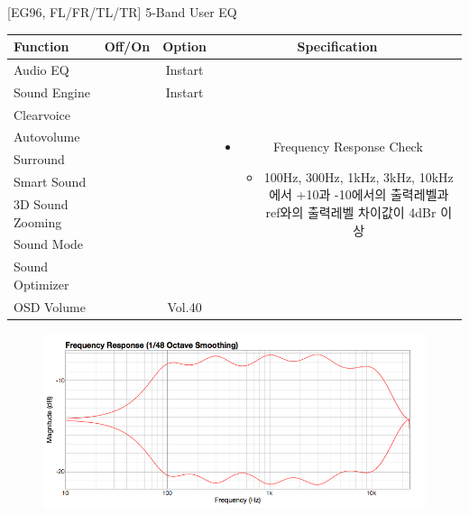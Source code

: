 \documentclass{beamer}
\begin{document}
\begin{frame}[t]{[EG96, FL/FR/TL/TR] 5-Band User EQ}
\begin{tiny}
\begin{tabular}{@{}lccc@{}}
\toprule
Function & Off/On & Option & Specification \\
\midrule
Audio EQ & \color{black}{Off} & Instart &
\multirow{10}{60mm}{
\begin{itemize}
\item Frequency Response Check
	\begin{itemize}
	\item 100Hz, 300Hz, 1kHz, 3kHz, 10kHz에서 +10과 -10에서의 출력레벨과 ref와의 출력레벨 차이값이 4dBr 이상
	\end{itemize}
\end{itemize}
} \\
Sound Engine & \color{blue}{On} & Instart & \\
Clearvoice & \color{black}{Off} & & \\
Autovolume & \color{black}{Off} & & \\
Surround & \color{black}{Off} & & \\
Smart Sound & \color{black}{Off} & & \\
3D Sound Zooming & \color{black}{Off} & & \\
Sound Mode & \color{blue}{On} & \color{blue}{User EQ±10} & \\
Sound Optimizer & \color{black}{Off} & & \\
OSD Volume & \color{blue}{On} & Vol.40 & \\
\midrule
\end{tabular}
\end{tiny}

\begin{figure}[b]
\includegraphics[height=0.4\textwidth]{figure/EG96/5_band_user_eq.png}
\end{figure}

\end{frame}
\end{document}
